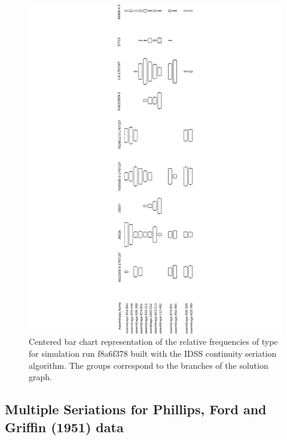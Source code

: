 \begin{figure}[ht]
\centering
\includegraphics[scale=0.5]{graphics/multipleseriation/continuity.pdf}
\caption{Centered bar chart representation of the relative frequencies of type for simulation run f8a6f378 built with the IDSS continuity seriation algorithm. The groups correspond to the branches of the solution graph.}
\label{img:continuity}
\end{figure}

\subsection{Multiple Seriations for Phillips, Ford and Griffin (1951)
data}\label{multiple-seriations-for-phillips-ford-and-griffin-1951-data}

